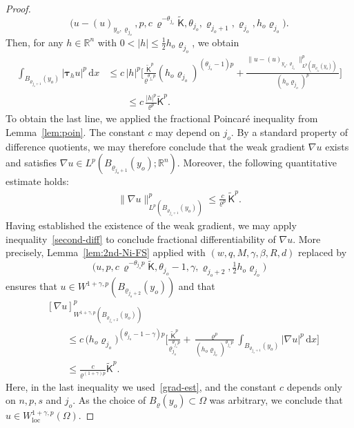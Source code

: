\documentclass[10pt,letterpaper]{amsart}
\theoremstyle{definition}
\numberwithin{theorem}{section}
\numberwithin{equation}{section}
\newcommand{\R}{\ensuremath{\mathbb{R}}}
\newcommand{\1}{\ensuremath{\mathds{1}}}
\newcommand{\dx}{\mathrm{d}x}
\newcommand\sfK{{\boldsymbol{\mathsf K}}}
\renewcommand{\rho}{\varrho}
\renewcommand{\rho}{\varrho}
\numberwithin{equation}{section}
\begin{document}
\begin{proof}
\[
\Big(u-(u)_{y_o,\rho_{j_o}}, p, c\,\rho^{-\theta_{j_o}}\widetilde\sfK, \theta_{j_o}, \rho_{j_o+1}, \rho_{j_o},  h_o\rho_{j_o}\Big).
\]
Then, for any $h\in\R^n$ with $0<|h|\le \frac12 h_o\rho_{j_o}$, we obtain
\begin{align*}
    \int_{B_{\rho_{j_o+1}}(y_o)} |\boldsymbol{\tau}_h u|^p \,\dx
    &\le
    c\, |h|^p \Bigg[\frac{\widetilde\sfK^p}{\rho^{\theta_{j_o} p}} (h_o\rho_{j_o})^{(\theta_{j_o}-1)p} + \frac{\|u-(u)_{y_o,\rho_{j_o}}\|^p_{L^p(B_{\rho_{j_o}}(y_o))}}{(h_o\rho_{j_o})^p}  \Bigg] \\ 
    &\qquad\le
    c\, \frac{|h|^p}{\rho^p} \widetilde\sfK^p .
\end{align*}
To obtain the last line, we applied the fractional Poincar\'e inequality from Lemma~\ref{lem:poin}.
The constant $c$ may depend on $j_o$.
By a standard property of difference quotients, we may therefore conclude
that the weak gradient \(\nabla u\) exists and satisfies
\(\nabla u \in L^p(B_{\rho_{j_o+1}}(y_o);\mathbb{R}^n)\).
Moreover, the following quantitative estimate holds:
\begin{align}\label{grad-est}
    \|\nabla u\|_{L^p(B_{\rho_{j_o+1}}(y_o))}^p
    \le
    \frac{c}{\rho^p}\,\widetilde{\sfK}^p .
\end{align}
Having established the existence of the weak gradient, we may apply
inequality~\eqref{second-diff} to conclude fractional differentiability
of \(\nabla u\). More precisely, Lemma~\ref{lem:2nd-Ni-FS} applied with $(w,q,M,\gamma,\beta,R,d)$ replaced by 
\[
    \Big(u, p, c\,\rho^{-\theta_{j_o} p}\widetilde\sfK, \theta_{j_o}-1, \gamma, \rho_{j_o+2}, \tfrac12 h_o\rho_{j_o}\Big)
\]
ensures that $u\in W^{1+ \gamma, p}(B_{\rho_{j_o+2}}(y_o))$ and that
\begin{align}\label{grad-diff-est}\nonumber
    &[\nabla u]_{W^{1+ \gamma, p}(B_{\rho_{j_o+2}}(y_o))}^p \\
    &\qquad \leq 
    c\, \big(h_o\rho_{j_o}\big)^{(\theta_{j_o}-1-\gamma)p} \bigg[ \frac{\widetilde\sfK^p}{\rho_{j_o}^{\theta_{j_o} p}} + \frac{\rho^p}{(h_o\rho_{j_o})^{\theta_{j_o} p}} \int_{B_{\rho_{j_o+1}}(y_o)} |\nabla u|^p \,\dx \bigg] \nonumber\\
    &\qquad \leq 
    \frac{c}{\rho^{(1+\gamma)p}} \widetilde\sfK^p .
\end{align}
Here, in the last inequality we used~\eqref{grad-est}, and the constant
\(c\) depends only on \(n,p,s\) and \(j_o\).
As the choice of \(B_\rho(y_o)\subset\Omega\) was arbitrary, we conclude
that \(u\in W^{1+\gamma,p}_{\mathrm{loc}}(\Omega)\).
\smallskip


\end{proof}
\end{document}
